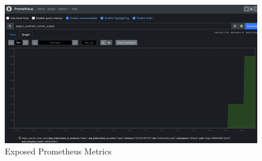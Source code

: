 \documentclass[12pt, conference, final, a4paper, onecolumn, compsoc]{IEEEtran}
\begin{document}


\begin{figure}[H]
  \centering \includegraphics[scale=0.31]{images/prometheus-metrics.png}
  \caption{Exposed Prometheus Metrics}
  \label{appendix:prometheus-metrics}
\end{figure}



\bigskip 




\bigskip

 
\end{document}
